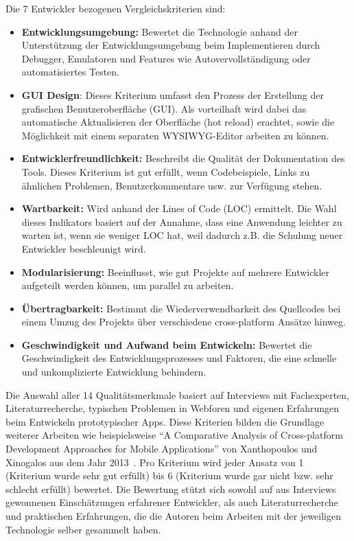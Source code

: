 Die 7 Entwickler bezogenen Vergleichskriterien sind:
\begin{itemize}
    \item \textbf{Entwicklungsumgebung:} Bewertet die Technologie anhand der Unterstützung der Entwicklungsumgebung beim Implementieren durch Debugger, Emulatoren und Features wie Autovervollständigung oder automatisiertes Testen.
    \item \textbf{GUI Design}: Dieses Kriterium umfasst den Prozess der Erstellung der grafischen Benutzeroberfläche (GUI). Als vorteilhaft wird dabei das automatische Aktualisieren der Oberfläche (hot reload) erachtet, sowie die Möglichkeit mit einem separaten WYSIWYG-Editor arbeiten zu können.
    \item \textbf{Entwicklerfreundlichkeit:} Beschreibt die Qualität der Dokumentation des Tools. Dieses Kriterium ist gut erfüllt, wenn Codebeispiele, Links zu ähnlichen Problemen, Benutzerkommentare usw. zur Verfügung stehen.
    \item \textbf{Wartbarkeit:} Wird anhand der Lines of Code (LOC) ermittelt. Die Wahl dieses Indikators basiert auf der Annahme, dass eine Anwendung leichter zu warten ist, wenn sie weniger LOC hat, weil dadurch z.B. die Schulung neuer Entwickler beschleunigt wird.
    \item \textbf{Modularisierung:} Beeinflusst, wie gut Projekte auf mehrere Entwickler aufgeteilt werden können, um parallel zu arbeiten.
    \item \textbf{Übertragbarkeit:} Bestimmt die Wiederverwendbarkeit des Quellcodes bei einem Umzug des Projekts über verschiedene cross-platform Ansätze hinweg.
    \item \textbf{Geschwindigkeit und Aufwand beim Entwickeln:} Bewertet die Geschwindigkeit des Entwicklungsprozesses und Faktoren, die eine schnelle und unkomplizierte Entwicklung behindern.
\end{itemize}
Die Auswahl aller 14 Qualitätsmerkmale basiert auf Interviews mit Fachexperten, Literaturrecherche, typischen Problemen in Webforen und eigenen Erfahrungen beim Entwickeln prototypischer Apps.
Diese Kriterien bilden die Grundlage weiterer Arbeiten wie beispielsweise “A Comparative Analysis of Cross-platform Development Approaches for Mobile Applications” von Xanthopoulos und Xinogalos aus dem Jahr 2013~\cite{compa13}.
Pro Kriterium wird jeder Ansatz von 1 (Kriterium wurde sehr gut erfüllt) bis 6 (Kriterium wurde gar nicht bzw. sehr schlecht erfüllt) bewertet. Die Bewertung stützt sich sowohl auf aus Interviews gewonnenen Einschätzungen erfahrener Entwickler, als auch Literaturrecherche und praktischen Erfahrungen, die die Autoren beim Arbeiten mit der jeweiligen Technologie selber gesammelt haben.\\ \\
